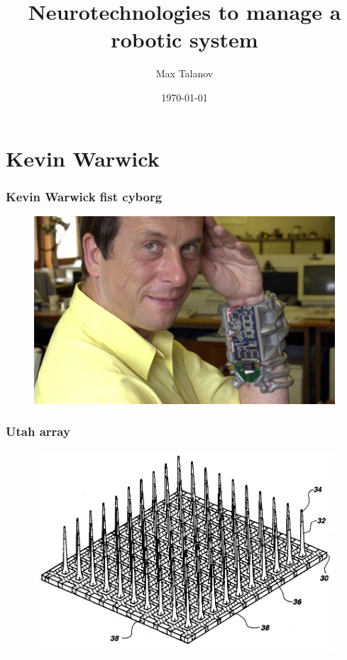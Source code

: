 \documentclass[12pt, aspectratio=169]{beamer}
\title[Neurotechnologies to manage a robotic system]{Neurotechnologies to manage a robotic system} %
\author[Max Talanov]{
  Max Talanov
}
\institute[NcN laboratory: ITIS : KFU]%
{
Neuromorphic computing and Neurosimulations laboratory, ITIS, KFU \\ %
\medskip
\textit{max.talanov@gmail.com} %
}
\date{\today} %
\begin{document}
\begin{frame}
\titlepage %
\end{frame}



\section{Kevin Warwick}
\begin{frame}
  \frametitle{Kevin Warwick fist cyborg}
  \begin{figure}
    \includegraphics[width=0.7\linewidth]{Kevin-Warwick_2936650k}
  \end{figure}
\end{frame}


\begin{frame}
  \frametitle{Utah array}
  \begin{figure}
    \includegraphics[width=0.7\linewidth]{Utah_array_pat5215088}
  \end{figure}
\end{frame}
\end{document}
